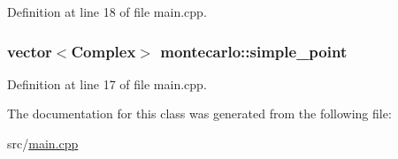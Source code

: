 Definition at line 18 of file main.\-cpp.

\hypertarget{classmontecarlo_afa58e686716af929a45f7ec359a75654}{
\subsubsection[{simple\-\_\-point}]{\setlength{\rightskip}{0pt plus 5cm}vector$<${\bf Complex}$>$ montecarlo\-::simple\-\_\-point}}\label{classmontecarlo_afa58e686716af929a45f7ec359a75654}


Definition at line 17 of file main.\-cpp.



The documentation for this class was generated from the following file\-:\begin{DoxyCompactItemize}
\item 
src/\hyperlink{main_8cpp}{main.\-cpp}\end{DoxyCompactItemize}
